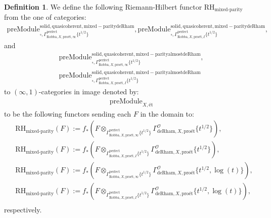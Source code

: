 \documentclass[12pt]{book}
\theoremstyle{definition}
\newtheorem{definition}{Definition}
\begin{document}
\begin{definition}
We define the following Riemann-Hilbert functor $\text{RH}_\text{mixed-parity}$ from the one of categories:
\begin{align}
\mathrm{preModule}^\mathrm{solid,quasicoherent,mixed-paritydeRham}_{\square,\Gamma^\mathrm{perfect}_{\text{Robba},X,\text{pro\'et},\infty}\{t^{1/2}\}},
\mathrm{preModule}^\mathrm{solid,quasicoherent,mixed-paritydeRham}_{\square,\Gamma^\mathrm{perfect}_{\text{Robba},X,\text{pro\'et},I}\{t^{1/2}\}}, 
\end{align}
and
\begin{align}
\mathrm{preModule}^\mathrm{solid,quasicoherent,mixed-parityalmostdeRham}_{\square,\Gamma^\mathrm{perfect}_{\text{Robba},X,\text{pro\'et},\infty}\{t^{1/2}\}},\\
\mathrm{preModule}^\mathrm{solid,quasicoherent,mixed-parityalmostdeRham}_{\square,\Gamma^\mathrm{perfect}_{\text{Robba},X,\text{pro\'et},I}\{t^{1/2}\}} 
\end{align}
to $(\infty,1)$-categories in image denoted by:
\begin{align}
\mathrm{preModule}_{X,\text{\'et}}
\end{align}
to be the following functors sending each $F$ in the domain to:
\begin{align}
&\text{RH}_\text{mixed-parity}(F):=f_*(F\otimes_{\Gamma^\mathrm{perfect}_{\text{Robba},X,\text{pro\'et},\infty}\{t^{1/2}\}} \Gamma^\mathcal{O}_{\text{deRham},X,\text{pro\'et}}\{t^{1/2}\}),\\
&\text{RH}_\text{mixed-parity}(F):=f_*(F\otimes_{\Gamma^\mathrm{perfect}_{\text{Robba},X,\text{pro\'et},I}\{t^{1/2}\}} \Gamma^\mathcal{O}_{\text{deRham},X,\text{pro\'et}}\{t^{1/2}\}),\\
&\text{RH}_\text{mixed-parity}(F):=f_*(F\otimes_{\Gamma^\mathrm{perfect}_{\text{Robba},X,\text{pro\'et},\infty}\{t^{1/2}\}} \Gamma^\mathcal{O}_{\text{deRham},X,\text{pro\'et}}\{t^{1/2},\log(t)\}),\\
&\text{RH}_\text{mixed-parity}(F):=f_*(F\otimes_{\Gamma^\mathrm{perfect}_{\text{Robba},X,\text{pro\'et},I}\{t^{1/2}\}} \Gamma^\mathcal{O}_{\text{deRham},X,\text{pro\'et}}\{t^{1/2},\log(t)\}),\\
\end{align}
respectively.

\end{definition}
\end{document}
